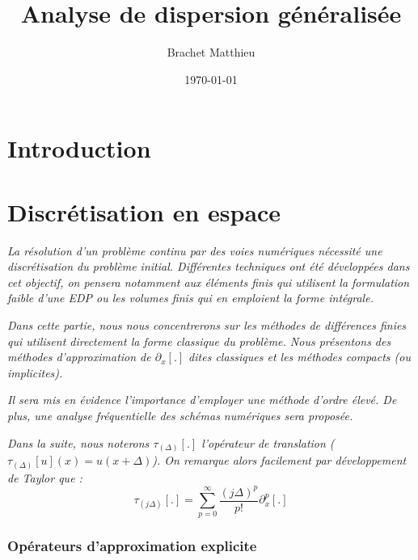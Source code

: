 \documentclass[10pt,a4paper]{amsart}
\author{Brachet Matthieu}
\title{Analyse de dispersion généralisée}
\date\today
\begin{document}
\maketitle

%
%

\part{Introduction}

%
%

\part{Discrétisation en espace}

\textit{
La résolution d'un problème continu par des voies numériques nécessité une discrétisation du problème initial. Différentes techniques ont été développées dans cet objectif, on pensera notamment aux éléments finis qui utilisent la formulation faible d'une EDP ou les volumes finis qui en emploient la forme intégrale.
}

\textit{
Dans cette partie, nous nous concentrerons sur les méthodes de différences finies qui utilisent directement la forme classique du problème. Nous présentons des méthodes d'approximation de $\partial_x \left[ . \right]$ dites classiques et les méthodes compacts (ou implicites). 
}

\textit{
Il sera mis en évidence l'importance d'employer une méthode d'ordre élevé. De plus, une analyse fréquentielle des schémas numériques sera proposée.
}

\textit{
Dans la suite, nous noterons $\tau_{(\Delta)} \left[ . \right]$ l'opérateur de translation ($\tau_{(\Delta)}\left[ u \right](x) = u(x + \Delta)$). On remarque alors facilement par développement de Taylor que :
}
\begin{equation}\label{taylor}
\tau_{(j\Delta)}\left[ . \right] = \sum_{p=0}^{\infty} \dfrac{(j \Delta)^p}{p!}\partial_x^p\left[ . \right]
\end{equation}

\section{Opérateurs d'approximation explicite}
\end{document}

